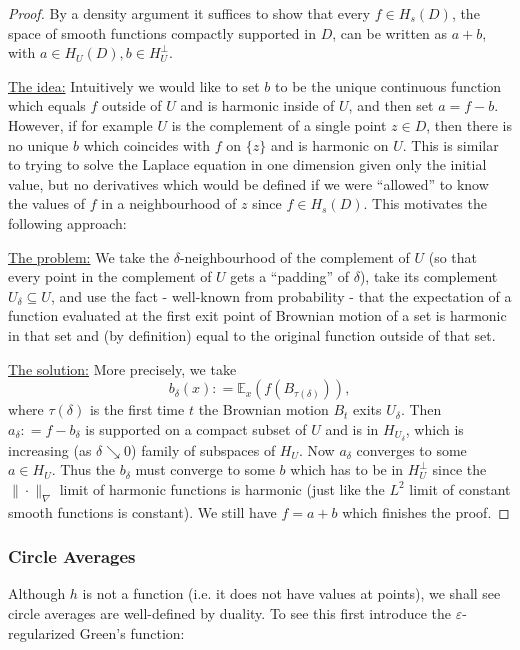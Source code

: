\documentclass[11pt,reqno]{amsart}
\numberwithin{equation}{section}
\newcommand{\deq}{\mathrel{\mathop:}=}
\newcommand{\eps}{\varepsilon}
\begin{document}
\begin{proof}
	By a density argument it suffices to show that every $f\in H_s(D)$, the space of smooth functions compactly supported in $D$, can be written as $a+b$, with $a\in H_U(D), b\in H_U^\perp$.
	
	\underline{The idea:} Intuitively we would like to set $b$ to be the unique continuous function which equals $f$ outside of $U$ and is harmonic inside of $U$, and then set $a=f-b$. However, if for example $U$ is the complement of a single point $z\in D$, then there is no unique $b$ which coincides with $f$ on $\{z\}$ and is harmonic on $U$. This is similar to trying to solve the Laplace equation in one dimension given only the initial value, but no derivatives which would be defined if we were ``allowed'' to know the values of $f$ in a neighbourhood of $z$ since $f\in H_s(D)$. This motivates the following approach:
	
	\underline{The problem:} We take the $\delta$-neighbourhood of the complement of $U$ (so that every point in the complement of $U$ gets a ``padding'' of $\delta$), take its complement $U_\delta\subseteq U$, and use the fact - well-known from probability - that the expectation of a function evaluated at the first exit point of Brownian motion of a set is harmonic in that set and (by definition) equal to the original function outside of that set.
	
	\underline{The solution:} More precisely, we take $$b_\delta(x)\deq \mathbb E_x(f(B_{\tau(\delta)})),$$ where $\tau(\delta)$ is the first time $t$ the Brownian motion $B_t$ exits $U_\delta$. Then $a_\delta\deq f-b_\delta$ is supported on a compact subset of $U$ and is in $H_{U_\delta}$, which is increasing (as $\delta\searrow 0$) family of subspaces of $H_U$. Now $a_\delta$ converges to some $a\in H_U$. Thus the $b_\delta$ must converge to some $b$ which has to be in $H_U^\perp$ since the $\|\cdot\|_\nabla$ limit of harmonic functions is harmonic (just like the $L^2$ limit of constant smooth functions is constant). 
	We still have $f=a+b$ which finishes the proof.
\end{proof}

\subsubsection{Circle Averages}

Although $h$ is not a function (i.e. it does not have values at points), we shall see circle averages are well-defined by duality. To see this first introduce the $\eps$-regularized Green's function:
\end{document}

